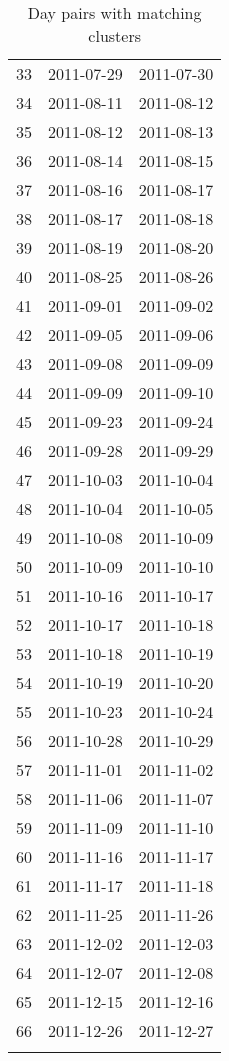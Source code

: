 \begin{longtable}{rll}
  33 & 2011-07-29 & 2011-07-30 \\ 
  34 & 2011-08-11 & 2011-08-12 \\ 
  35 & 2011-08-12 & 2011-08-13 \\ 
  36 & 2011-08-14 & 2011-08-15 \\ 
  37 & 2011-08-16 & 2011-08-17 \\ 
  38 & 2011-08-17 & 2011-08-18 \\ 
  39 & 2011-08-19 & 2011-08-20 \\ 
  40 & 2011-08-25 & 2011-08-26 \\ 
  41 & 2011-09-01 & 2011-09-02 \\ 
  42 & 2011-09-05 & 2011-09-06 \\ 
  43 & 2011-09-08 & 2011-09-09 \\ 
  44 & 2011-09-09 & 2011-09-10 \\ 
  45 & 2011-09-23 & 2011-09-24 \\ 
  46 & 2011-09-28 & 2011-09-29 \\ 
  47 & 2011-10-03 & 2011-10-04 \\ 
  48 & 2011-10-04 & 2011-10-05 \\ 
  49 & 2011-10-08 & 2011-10-09 \\ 
  50 & 2011-10-09 & 2011-10-10 \\ 
  51 & 2011-10-16 & 2011-10-17 \\ 
  52 & 2011-10-17 & 2011-10-18 \\ 
  53 & 2011-10-18 & 2011-10-19 \\ 
  54 & 2011-10-19 & 2011-10-20 \\ 
  55 & 2011-10-23 & 2011-10-24 \\ 
  56 & 2011-10-28 & 2011-10-29 \\ 
  57 & 2011-11-01 & 2011-11-02 \\ 
  58 & 2011-11-06 & 2011-11-07 \\ 
  59 & 2011-11-09 & 2011-11-10 \\ 
  60 & 2011-11-16 & 2011-11-17 \\ 
  61 & 2011-11-17 & 2011-11-18 \\ 
  62 & 2011-11-25 & 2011-11-26 \\ 
  63 & 2011-12-02 & 2011-12-03 \\ 
  64 & 2011-12-07 & 2011-12-08 \\ 
  65 & 2011-12-15 & 2011-12-16 \\ 
  66 & 2011-12-26 & 2011-12-27 \\ 
   \hline
\hline
\caption{Day pairs with matching clusters} 
\label{tab:DayPairs}
\end{longtable}
